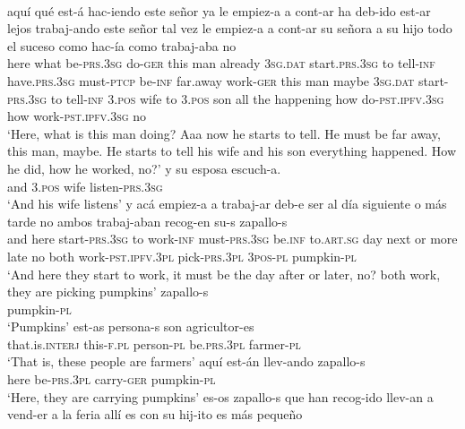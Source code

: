 \documentclass[output=paper]{langsci/langscibook}
\begin{document}
\ea \label{ex:gq13}
\\
	\ea \label{ex:gq13a}
	\gll aquí qué est-á hac-iendo este señor ya le empiez-a a cont-ar ha  deb-ido est-ar lejos trabaj-ando este señor {tal vez} le empiez-a a cont-ar su señora a su hijo todo el suceso como hac-ía como trabaj-aba no\\
	here what be-\textsc{prs.3sg} do-\textsc{ger} this man already \textsc{3sg.dat} start.\textsc{prs.3sg} to tell-\textsc{inf} have.\textsc{prs.3sg} must-\textsc{ptcp} be-\textsc{inf} far.away work-\textsc{ger} this man maybe \textsc{3sg.dat} start-\textsc{prs.3sg} to tell-\textsc{inf} \textsc{3.pos} wife to \textsc{3.pos} son all the happening how do-\textsc{pst.ipfv.3sg} how work-\textsc{pst.ipfv.3sg} no\\
	\glt ‘Here, what is this man doing? Aaa now he starts to tell. He must be far away, this man, maybe. He starts to tell his wife and his son everything happened. How he did, how he worked, no?’
	\ex \label{ex:gq13b}
	\gll y su esposa escuch-a.\\
	and \textsc{3.pos} wife listen-\textsc{prs.3sg}\\
 	\glt ‘And his wife listens’
	\ex \label{ex:gq13c}
	\gll y acá empiez-a a trabaj-ar deb-e ser al día siguiente o más tarde no ambos trabaj-aban recog-en su-s zapallo-s\\
	and here start-\textsc{prs.3sg} to work-\textsc{inf} must-\textsc{prs.3sg} be.\textsc{inf} to.\textsc{art.sg} day next or more late no both work-\textsc{pst.ipfv.3pl} pick-\textsc{prs.3pl} \textsc{3pos-pl} pumpkin-\textsc{pl}\\
 	\glt ‘And here they start to work, it must be the day after or later, no? both work, they are picking pumpkins’ 
	\ex \label{ex:gq13d}
	\gll zapallo-s\\
	pumpkin-\textsc{pl}\\
	\glt ‘Pumpkins’ 
	\ex \label{ex:gq13e}
	 est-as persona-s son agricultor-es\\
	that.is.\textsc{interj} this-\textsc{f.pl} person-\textsc{pl} be.\textsc{prs.3pl} farmer-\textsc{pl}\\
	\glt ‘That is, these people are farmers’
	\ex \label{ex:gq13f}
	\gll  aquí est-án llev-ando zapallo-s\\
	here be-\textsc{prs.3pl} carry-\textsc{ger} pumpkin-\textsc{pl}\\
	\glt ‘Here, they are carrying pumpkins’
	\ex \label{ex:gq13g}
	\gll  es-os zapallo-s que han recog-ido llev-an a vend-er a la feria allí es con su hij-ito es más pequeño\\
\end{document}
